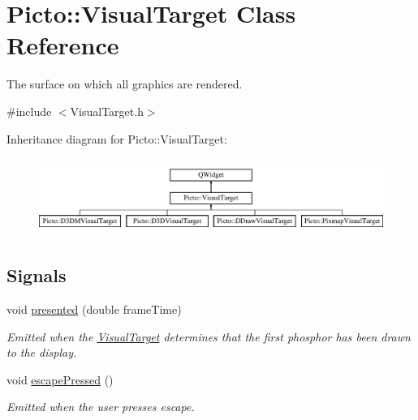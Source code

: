 \hypertarget{class_picto_1_1_visual_target}{\section{Picto\-:\-:Visual\-Target Class Reference}
\label{class_picto_1_1_visual_target}
}


The surface on which all graphics are rendered.  




{\ttfamily \#include $<$Visual\-Target.\-h$>$}

Inheritance diagram for Picto\-:\-:Visual\-Target\-:\begin{figure}[H]
\begin{center}
\leavevmode
\includegraphics[height=2.545455cm]{class_picto_1_1_visual_target}
\end{center}
\end{figure}
\subsection*{Signals}
\begin{DoxyCompactItemize}
\item 
\hypertarget{class_picto_1_1_visual_target_ad04e5a944c2b5d31814ba32b2b93180e}{void \hyperlink{class_picto_1_1_visual_target_ad04e5a944c2b5d31814ba32b2b93180e}{presented} (double frame\-Time)}\label{class_picto_1_1_visual_target_ad04e5a944c2b5d31814ba32b2b93180e}

\begin{DoxyCompactList}\small\item\em Emitted when the \hyperlink{class_picto_1_1_visual_target}{Visual\-Target} determines that the first phosphor has been drawn to the display. \end{DoxyCompactList}\item 
void \hyperlink{class_picto_1_1_visual_target_a4d88819d03209b34ffdae2cc736b5066}{escape\-Pressed} ()
\begin{DoxyCompactList}\small\item\em Emitted when the user presses escape. \end{DoxyCompactList}\end{DoxyCompactItemize}
